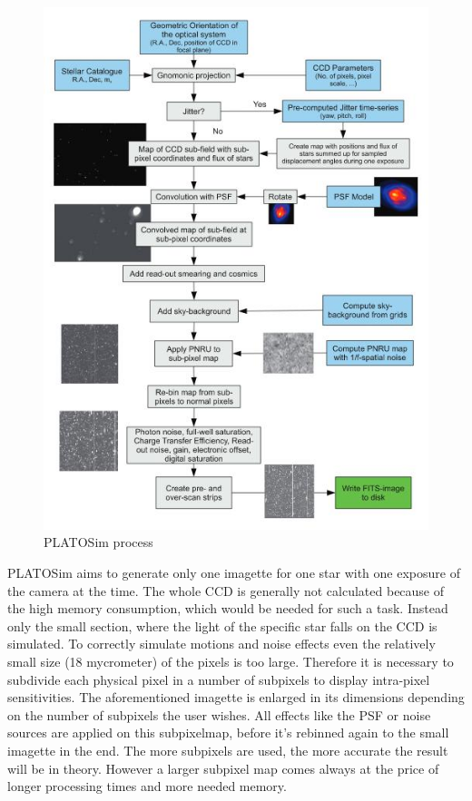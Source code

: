 \begin{figure}[h]
\centering
\includegraphics[width=\textwidth]{PLATOSim_Ablauf.jpg}
\caption{PLATOSim process}
\label{fig:mesh1}
\end{figure}

PLATOSim aims to generate only one imagette for one star with one exposure of the camera at the time. The whole CCD is generally not calculated because of the high memory consumption, which would be needed for such a task. Instead only the small section, where the light of the specific star falls on the CCD is simulated.
\newline
To correctly simulate motions and noise effects even the relatively small size (18 mycrometer) of the pixels is too large. Therefore it is necessary to subdivide each physical pixel in a number of subpixels to display intra-pixel sensitivities. The aforementioned imagette is enlarged in its dimensions depending on the number of subpixels the user wishes. All effects like the PSF or noise sources are applied on this subpixelmap, before it's rebinned again to the small imagette in the end. The more subpixels are used, the more accurate the result will be in theory.  However a larger subpixel map comes always at the price of longer processing times and more needed memory. 

